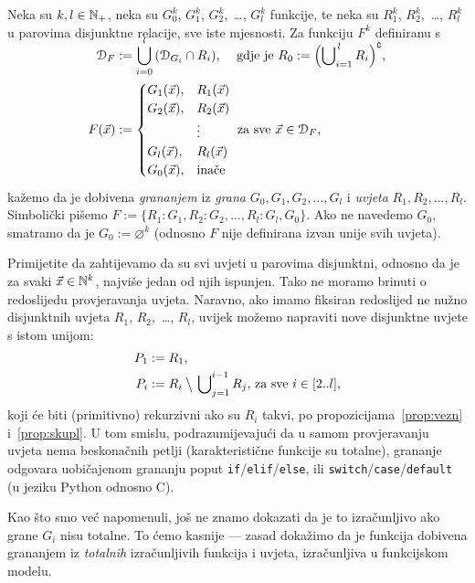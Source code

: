 \begin{definicija}\label{def:gr}
Neka su $k,l\in{\mathbb N}_+$, neka su $G_0^k$, $G_1^k$, $G_2^k$,~\ldots, $G_l^k$ funkcije, te neka su $R_1^k$, $R_2^k$,~\ldots, $R_l^k$ u parovima disjunktne relacije, sve iste mjesnosti. Za funkciju $F^k$ definiranu s
\begin{align}
\SwapAboveDisplaySkip
    \dom{F}&:=\bigcup_{i=0}^l\,(\dom{G_i}\cap R_i)\text{, \quad gdje je }
    R_0:=\Bigl(\bigcup\nolimits_{i=1}^{\,l}R_i\Bigr)\kompl\text,\\
    F(\vec x)&:=\begin{cases}
    G_1(\vec x),&R_1(\vec x)\\
    G_2(\vec x),&R_2(\vec x)\\
    &\vdots\\
    G_l(\vec x),&R_l(\vec x)\\
    G_0(\vec x),&\text{inače}
    \end{cases}\text{ za sve $\vec x\in\dom F$,}
\end{align}
kažemo da je dobivena \emph{grananjem} iz \emph{grana} $G_0,G_1,G_2,\dotsc,G_l$ i \emph{uvjeta} $R_1,R_2,\dotsc,R_l$. Simbolički pišemo $F:=\{R_1\colon G_1,R_2\colon G_2,\dotsc,R_l\colon G_l,G_0\}$. Ako ne navedemo $G_0$, smatramo da je $G_0:=\varnothing^k$ (odnosno $F$ nije definirana izvan unije svih uvjeta).
\end{definicija}

Primijetite da zahtijevamo da su svi uvjeti u parovima disjunktni, odnosno da je za svaki $\vec x\in{\mathbb N}^k$, najviše jedan od njih ispunjen. Tako ne moramo brinuti o redoslijedu provjeravanja uvjeta. Naravno, ako imamo fiksiran redoslijed ne nužno disjunktnih uvjeta $R_1$, $R_2$,~\ldots, $R_l$, uvijek možemo napraviti nove disjunktne uvjete s istom unijom:
\begin{align}
    P_1&:=R_1\text,\\
    P_i&:=R_i\mathbin{\big\backslash}\,\bigcup\nolimits_{j=1}^{i-1}R_j\text{, za sve $i\in[2..l]$,}
\end{align}
koji će biti (primitivno) rekurzivni ako su $R_i$ takvi, po propozicijama~\ref{prop:vezn} i~\ref{prop:skupl}. U tom smislu, podrazumijevajući da u samom provjeravanju uvjeta nema beskonačnih petlji (karakteristične funkcije su totalne), grananje odgovara uobičajenom grananju poput \texttt{if}/\texttt{elif}/\texttt{else}, ili \texttt{switch}/\texttt{case}/\texttt{default} (u jeziku Python odnosno C).

Kao što smo već napomenuli, još ne znamo dokazati da je to izračunljivo ako grane $G_i$ nisu totalne. To ćemo kasnije --- zasad dokažimo da je funkcija dobivena grananjem iz \emph{totalnih} izračunljivih funkcija i uvjeta, izračunljiva u funkcijskom modelu.

